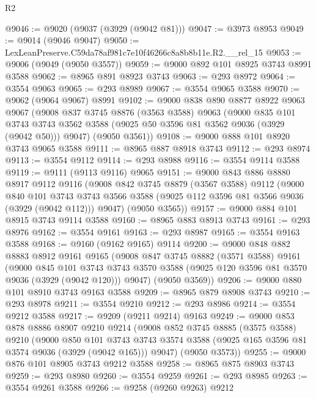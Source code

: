 \begin{lexlean}{R2}
\begin{coremodule}
@9046 := @9020 (@9037 (@3929 (@9042 @81)))
@9047 := @3973 @8953
@9049 := @9014 (@9046 @9047)
@9050 := LexLeanPreserve.C59da78af981c7e10f46266c8a8b8b11e.R2.__rel_15
@9053 := @9006 (@9049 (@9050 @3557))
@9059 := @9000 @892 @101 @8925 @3743 @8991 @3588
@9062 := @8965 @891 @8923 @3743
@9063 := @293 @8972
@9064 := @3554 @9063
@9065 := @293 @8989
@9067 := @3554 @9065 @3588
@9070 := @9062 (@9064 @9067) @8991
@9102 := @9000
    @838
    @890
    @8877
    @8922
    @9063
    @9067
    (@9008
      @837
      @3745
      @8876
      (@3563 @3588)
      @9063
      (@9000
        @835
        @101
        @3743
        @3743
        @3562
        @3588
        (@9025 @50 @3596 @81 @3562 @9036 (@3929 (@9042 @50)))
        @9047)
      (@9050 @3561))
@9108 := @9000 @888 @101 @8920 @3743 @9065 @3588
@9111 := @8965 @887 @8918 @3743
@9112 := @293 @8974
@9113 := @3554 @9112
@9114 := @293 @8988
@9116 := @3554 @9114 @3588
@9119 := @9111 (@9113 @9116) @9065
@9151 := @9000
    @843
    @886
    @8880
    @8917
    @9112
    @9116
    (@9008
      @842
      @3745
      @8879
      (@3567 @3588)
      @9112
      (@9000
        @840
        @101
        @3743
        @3743
        @3566
        @3588
        (@9025 @112 @3596 @81 @3566 @9036 (@3929 (@9042 @112)))
        @9047)
      (@9050 @3565))
@9157 := @9000 @884 @101 @8915 @3743 @9114 @3588
@9160 := @8965 @883 @8913 @3743
@9161 := @293 @8976
@9162 := @3554 @9161
@9163 := @293 @8987
@9165 := @3554 @9163 @3588
@9168 := @9160 (@9162 @9165) @9114
@9200 := @9000
    @848
    @882
    @8883
    @8912
    @9161
    @9165
    (@9008
      @847
      @3745
      @8882
      (@3571 @3588)
      @9161
      (@9000
        @845
        @101
        @3743
        @3743
        @3570
        @3588
        (@9025 @120 @3596 @81 @3570 @9036 (@3929 (@9042 @120)))
        @9047)
      (@9050 @3569))
@9206 := @9000 @880 @101 @8910 @3743 @9163 @3588
@9209 := @8965 @879 @8908 @3743
@9210 := @293 @8978
@9211 := @3554 @9210
@9212 := @293 @8986
@9214 := @3554 @9212 @3588
@9217 := @9209 (@9211 @9214) @9163
@9249 := @9000
    @853
    @878
    @8886
    @8907
    @9210
    @9214
    (@9008
      @852
      @3745
      @8885
      (@3575 @3588)
      @9210
      (@9000
        @850
        @101
        @3743
        @3743
        @3574
        @3588
        (@9025 @165 @3596 @81 @3574 @9036 (@3929 (@9042 @165)))
        @9047)
      (@9050 @3573))
@9255 := @9000 @876 @101 @8905 @3743 @9212 @3588
@9258 := @8965 @875 @8903 @3743
@9259 := @293 @8980
@9260 := @3554 @9259
@9261 := @293 @8985
@9263 := @3554 @9261 @3588
@9266 := @9258 (@9260 @9263) @9212

\end{coremodule}
\end{lexlean}
